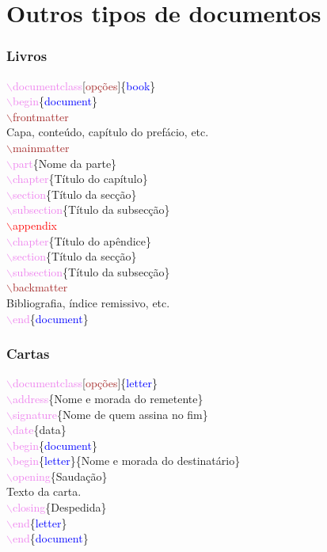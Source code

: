 \documentclass{beamer}
\begin{document}
\section{Outros tipos de documentos}
\begin{frame}
\frametitle{Livros}
\quad\textcolor{violet}{$\backslash$documentclass}[\textcolor{brown}{opções}]\{\textcolor{blue}{book}\}\\
\quad\textcolor{violet}{$\backslash$begin}\{\textcolor{blue}{document}\}\\
\qquad\textcolor{brown}{$\backslash$frontmatter}\\
\qquad Capa, conteúdo, capítulo do prefácio, etc.\\
\qquad\textcolor{brown}{$\backslash$mainmatter}\\
\qquad\textcolor{violet}{$\backslash$part}\{Nome da parte\}\\
\qquad\textcolor{violet}{$\backslash$chapter}\{Título do capítulo\}\\
\qquad\textcolor{violet}{$\backslash$section}\{Título da secção\}\\
\qquad\textcolor{violet}{$\backslash$subsection}\{Título da subsecção\}\\
\qquad\textcolor{red}{$\backslash$appendix}\\
\qquad\textcolor{violet}{$\backslash$chapter}\{Título do apêndice\}\\
\qquad\textcolor{violet}{$\backslash$section}\{Título da secção\}\\
\qquad\textcolor{violet}{$\backslash$subsection}\{Título da subsecção\}\\
\qquad\textcolor{brown}{$\backslash$backmatter}\\
\qquad Bibliografia, índice remissivo, etc.\\
\quad\textcolor{violet}{$\backslash$end}\{\textcolor{blue}{document}\}
\end{frame}
\begin{frame}
\frametitle{Cartas}
\quad\textcolor{violet}{$\backslash$documentclass}[\textcolor{brown}{opções}]\{\textcolor{blue}{letter}\}\\
\quad\textcolor{violet}{$\backslash$address}\{Nome e morada do remetente\}\\
\quad\textcolor{violet}{$\backslash$signature}\{Nome de quem assina no fim\}\\
\quad\textcolor{violet}{$\backslash$date}\{data\}\\
\quad\textcolor{violet}{$\backslash$begin}\{\textcolor{blue}{document}\}\\
\qquad\textcolor{violet}{$\backslash$begin}\{\textcolor{blue}{letter}\}\{Nome e morada do destinatário\}\\
\qquad\textcolor{violet}{$\backslash$opening}\{Saudação\}\\
\qquad Texto da carta.\\
\qquad\textcolor{violet}{$\backslash$closing}\{Despedida\}\\
\qquad\textcolor{violet}{$\backslash$end}\{\textcolor{blue}{letter}\}\\
\quad\textcolor{violet}{$\backslash$end}\{\textcolor{blue}{document}\}
\end{frame}
\end{document}
